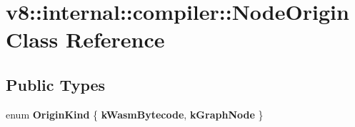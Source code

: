 \hypertarget{classv8_1_1internal_1_1compiler_1_1NodeOrigin}{}\section{v8\+:\+:internal\+:\+:compiler\+:\+:Node\+Origin Class Reference}
\label{classv8_1_1internal_1_1compiler_1_1NodeOrigin}
\subsection*{Public Types}
\begin{DoxyCompactItemize}
\item 
\mbox{\label{classv8_1_1internal_1_1compiler_1_1NodeOrigin_a2f9b6287838d06debde1bcccf5d41d72}} 
enum {\bfseries Origin\+Kind} \{ {\bfseries k\+Wasm\+Bytecode}, 
{\bfseries k\+Graph\+Node}
 \}
\end{DoxyCompactItemize}
